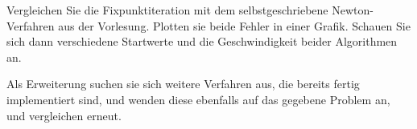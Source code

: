 \begin{aufg}[0]
Vergleichen Sie die Fixpunktiteration mit dem selbstgeschriebene Newton-Verfahren aus der Vorlesung. Plotten sie beide Fehler in einer Grafik. Schauen 
Sie sich dann verschiedene Startwerte und die Geschwindigkeit beider Algorithmen an. 

Als Erweiterung suchen sie sich weitere Verfahren aus, die bereits fertig implementiert sind, und wenden diese ebenfalls auf das gegebene Problem an, und vergleichen erneut.
\end{aufg}
